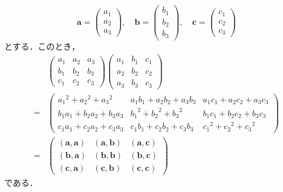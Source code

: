 \begin{tproof}
  \[
    \bm{a}=\begin{pmatrix} a_1 \\ a_2 \\ a_3 \end{pmatrix},\quad \bm{b}=\begin{pmatrix} b_1 \\ b_2 \\ b_3 \end{pmatrix},\quad \bm{c}=\begin{pmatrix} c_1 \\ c_2 \\ c_3 \end{pmatrix}
  \]
  とする．このとき，
  \begin{align*}
      &
    \begin{pmatrix}
      a_1 & a_2 & a_3 \\
      b_1 & b_2 & b_3 \\
      c_1 & c_2 & c_3
    \end{pmatrix}
    \begin{pmatrix}
      a_1 & b_1 & c_1 \\
      a_2 & b_2 & c_2 \\
      a_3 & b_3 & c_3
    \end{pmatrix}
    \\
    = & \begin{pmatrix}
          {a_1}^2 +{a_2}^2 +{a_3}^2   & a_1 b_1 + a_2 b_2 + a_3 b_3 & a_1 c_1 + a_2 c_2 + a_3 c_3 \\
          b_1 a_1 + b_2 a_2 + b_3 a_3 & {b_1}^2 +{b_2}^2 + {b_3}^2  & b_1 c_1 + b_2 c_2 + b_3 c_3 \\
          c_1 a_1 + c_2 a_2 + c_3 a_3 & c_1 b_1 + c_2 b_2 + c_3 b_3 & {c_1}^2 +{c_2}^2 +{c_3}^2
        \end{pmatrix}
    \\
    = & \begin{pmatrix}
          (\bm{a},\bm{a}) & (\bm{a},\bm{b}) & (\bm{a},\bm{c}) \\
          (\bm{b},\bm{a}) & (\bm{b},\bm{b}) & (\bm{b},\bm{c}) \\
          (\bm{c},\bm{a}) & (\bm{c},\bm{b}) & (\bm{c},\bm{c})
        \end{pmatrix}
  \end{align*}
  である．


\end{tproof}
